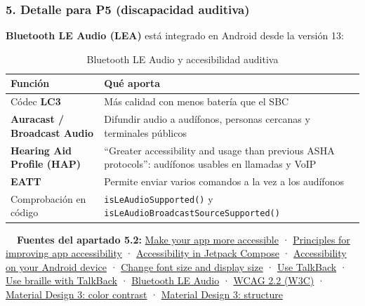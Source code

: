 \documentclass[11pt,a4paper]{article}
\newcommand{\code}[1]{\texttt{\color{ink}#1}}
\begin{document}
	\subsubsection*{5. Detalle para P5 (discapacidad auditiva)}
	
	\textbf{Bluetooth LE Audio (LEA)} está integrado en Android desde la versión 13:
	
	\begin{table}[htbp]
		\centering
		\small
		\begin{tabularx}{\textwidth}{@{}>{\RaggedRight\arraybackslash}p{4cm} >{\RaggedRight\arraybackslash}X@{}}
			\toprule
			\rowcolor{primary}
			\textcolor{paper}{\sffamily\bfseries Función} & \textcolor{paper}{\sffamily\bfseries Qué aporta} \\
			\midrule
			Códec \textbf{LC3} & Más calidad con menos batería que el SBC \\
			\rowcolor{soft}
			\textbf{Auracast / Broadcast Audio} & Difundir audio a audífonos, personas cercanas y terminales públicos \\
			\textbf{Hearing Aid Profile (HAP)} & \enquote{Greater accessibility and usage than previous ASHA protocols}: audífonos usables en llamadas y VoIP \\
			\rowcolor{soft}
			\textbf{EATT} & Permite enviar varios comandos a la vez a los audífonos \\
			Comprobación en código & \code{isLeAudioSupported()} y \code{isLeAudioBroadcastSourceSupported()} \\
			\bottomrule
		\end{tabularx}
		\caption{Bluetooth LE Audio y accesibilidad auditiva}
	\end{table}
	
	\begin{fuentesbox}
		\textbf{\color{muted}\faBook\ \ Fuentes del apartado 5.2:}
		\href{https://developer.android.com/guide/topics/ui/accessibility/apps}{Make your app more accessible} ·
		\href{https://developer.android.com/guide/topics/ui/accessibility/principles}{Principles for improving app accessibility} ·
		\href{https://developer.android.com/develop/ui/compose/accessibility}{Accessibility in Jetpack Compose} ·
		\href{https://support.google.com/accessibility/android/answer/6006564}{Accessibility on your Android device} ·
		\href{https://support.google.com/accessibility/android/answer/11183305}{Change font size and display size} ·
		\href{https://support.google.com/accessibility/android/answer/6007100}{Use TalkBack} ·
		\href{https://support.google.com/accessibility/android/answer/16323943}{Use braille with TalkBack} ·
		\href{https://developer.android.com/develop/connectivity/bluetooth/ble-audio/overview}{Bluetooth LE Audio} ·
		\href{https://www.w3.org/TR/WCAG22/}{WCAG 2.2 (W3C)} ·
		\href{https://m3.material.io/foundations/designing/color-contrast}{Material Design 3: color contrast} ·
		\href{https://m3.material.io/foundations/designing/structure}{Material Design 3: structure}
	\end{fuentesbox}
	
\end{document}
